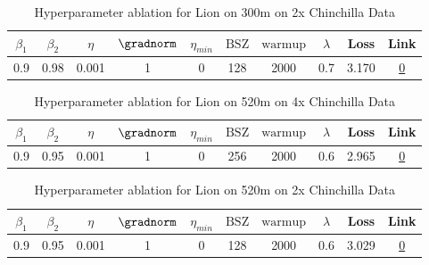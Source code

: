 \begin{table}[H]
\centering
\caption{Hyperparameter ablation for Lion on 300m on 2x Chinchilla Data}
\label{tab:ablation_lion_300m_2}
\begin{tabular}{cccccccccc}
\toprule
$\beta_1$ & $\beta_2$ & $\eta$ & $\gradnorm$ & $\eta_{min}$ & $\mathrm{BSZ}$ & $\mathrm{warmup}$ & $\lambda$ & Loss & Link \\
\midrule
0.9 & 0.98 & 0.001 & 1 & 0 & 128 & 2000 & 0.7 & 3.170 & \href{https://wandb.ai/stanford-mercury/optimizer-scaling/runs/sweep-300m-12B-lion5aad2alr0.001-wd0.7-minlr0-warmup2000-b10.9-b-b039e3}{0} \\
\midrule
\bottomrule
\end{tabular}
\end{table}

\begin{table}[H]
\centering
\caption{Hyperparameter ablation for Lion on 520m on 4x Chinchilla Data}
\label{tab:ablation_lion_520m_4}
\begin{tabular}{cccccccccc}
\toprule
$\beta_1$ & $\beta_2$ & $\eta$ & $\gradnorm$ & $\eta_{min}$ & $\mathrm{BSZ}$ & $\mathrm{warmup}$ & $\lambda$ & Loss & Link \\
\midrule
0.9 & 0.95 & 0.001 & 1 & 0 & 256 & 2000 & 0.6 & 2.965 & \href{https://wandb.ai/stanford-mercury/optimizer-scaling/runs/sweep-520m-42B-lion30535dlr0.001-wd0.6-minlr0-warmup2000-b10.9-b-b687e1}{0} \\
\midrule
\bottomrule
\end{tabular}
\end{table}

\begin{table}[H]
\centering
\caption{Hyperparameter ablation for Lion on 520m on 2x Chinchilla Data}
\label{tab:ablation_lion_520m_2}
\begin{tabular}{cccccccccc}
\toprule
$\beta_1$ & $\beta_2$ & $\eta$ & $\gradnorm$ & $\eta_{min}$ & $\mathrm{BSZ}$ & $\mathrm{warmup}$ & $\lambda$ & Loss & Link \\
\midrule
0.9 & 0.95 & 0.001 & 1 & 0 & 128 & 2000 & 0.6 & 3.029 & \href{https://wandb.ai/stanford-mercury/optimizer-scaling/runs/sweep-520m-21B-lion30535dlr0.001-wd0.6-minlr0-warmup2000-b10.9-b-c72b9c}{0} \\
\midrule
\bottomrule
\end{tabular}
\end{table}

